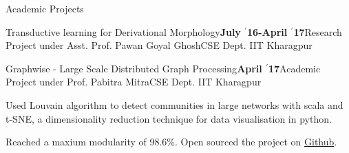 \documentclass{resume} %
\begin{document}
\begin{rSection}{Academic Projects}
\begin{rSubsection}{ \large Transductive learning for Derivational Morphology}{\textbf{\large July $^{\prime}$16-April $^{\prime}$17}}{Research Project under Asst. Prof. Pawan Goyal Ghosh}{CSE Dept. IIT Kharagpur}
\end{rSubsection}

\begin{rSubsection}{ \large Graphwise - Large Scale Distributed Graph Processing}{\textbf{\large April $^{\prime}$17}}{Academic Project under Prof. Pabitra Mitra}{CSE Dept. IIT Kharagpur}

\item Used Louvain algorithm to detect communities in large networks with scala and t-SNE, a dimensionality reduction technique for data visualisation in python.

\item Reached a maxium modularity of 98.6\%. Open sourced the project on \href{https://github.com/kaustubhhiware/Graphwise}{Github}.
\end{rSubsection}


\end{rSection}

\end{document}
